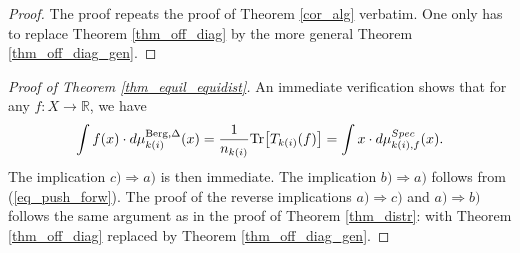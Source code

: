 \documentclass[12pt]{article}
\numberwithin{equation}{section}
\theoremstyle{theorem}
\theoremstyle{definition}
\theoremstyle{remark}
\newcommand{\real}{\mathbb{R}}
\newcommand{\tr}[1]{{\rm{Tr}} \big[ #1 \big]}
\begin{document}
	\begin{proof}
		The proof repeats the proof of Theorem \ref{cor_alg} verbatim.
		One only has to replace Theorem \ref{thm_off_diag} by the more general Theorem \ref{thm_off_diag_gen}.
	\end{proof}
	\begin{proof}[Proof of Theorem \ref{thm_equil_equidist}]
		An immediate verification shows that for any $f: X \to \real$, we have
		\begin{equation}
			\int f(x) \cdot d \mu_{k(i)}^{\rm{Berg}, \Delta}(x) 
			=
			\frac{1}{n_{k(i)}}
			\tr{T_{k(i)}(f)}
			=
			\int x \cdot d \mu_{k(i), f}^{Spec}(x).
		\end{equation}
		The implication $c) \Rightarrow a)$ is then immediate.
		The implication $b) \Rightarrow a)$ follows from (\ref{eq_push_forw}).
		The proof of the reverse implications $a) \Rightarrow c)$ and $a) \Rightarrow b)$ follows the same argument as in the proof of Theorem \ref{thm_distr}: with Theorem \ref{thm_off_diag} replaced by Theorem \ref{thm_off_diag_gen}.
	\end{proof}
	
	
	
\end{document}
